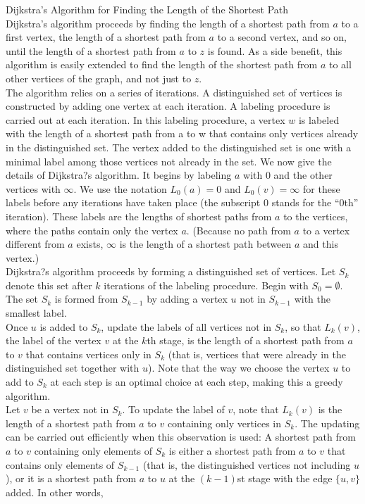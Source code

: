 \documentclass[12pt]{article}
\begin{document}
\begin{alg} Dijkstra's Algorithm for Finding the Length of the Shortest Path \\ 

Dijkstra's algorithm proceeds by finding the length of a shortest path from $a$ to a first vertex, the length of a shortest path from $a$ to a second vertex, and so on, until the length of a shortest path from $a$ to $z$ is found. As a side benefit, this algorithm is easily extended to find the length of the shortest path from $a$ to all other vertices of the graph, and not just to $z$.\\ The algorithm relies on a series of iterations. A distinguished set of vertices is constructed by adding one vertex at each iteration. A labeling procedure is carried out at each iteration. In this labeling procedure, a vertex $w$ is labeled with the length of a shortest path from a to w that contains only vertices already in the distinguished set. The vertex added to the distinguished set is one with a minimal label among those vertices not already in the set.
We now give the details of Dijkstra?s algorithm. It begins by labeling $a$ with 0 and the other vertices with $\infty$. We use the notation $L_0(a) = 0$ and $L_0(v) = \infty$ for these labels before any iterations have taken place (the subscript 0 stands for the ``0th'' iteration). These labels are the lengths of shortest paths from $a$ to the vertices, where the paths contain only the vertex $a$. (Because no path from $a$ to a vertex different from $a$ exists, $\infty$ is the length of a shortest path between $a$ and this vertex.) \\
Dijkstra?s algorithm proceeds by forming a distinguished set of vertices. Let $S_k$ denote this set after $k$ iterations of the labeling procedure. Begin with $S_0 = \emptyset$. The set $S_k$ is formed from $S_{k-1}$ by adding a vertex $u$ not in $S_{k-1}$ with the smallest label.\\
Once $u$ is added to $S_k$, update the labels of all vertices not in $S_k$, so that $L_k(v)$, the label of the vertex $v$ at the $k$th stage, is the length of a shortest path from $a$ to $v$ that contains vertices only in $S_k$ (that is, vertices that were already in the distinguished set together with $u$). Note that the way we choose the vertex $u$ to add to $S_k$ at each step is an optimal choice at each step, making this a greedy algorithm. \\
Let $v$ be a vertex not in $S_k$. To update the label of $v$, note that $L_k (v)$ is the length of a shortest path from $a$ to $v$ containing only vertices in $S_k$. The updating can be carried out efficiently when this observation is used: A shortest path from $a$ to $v$ containing only elements of $S_k$ is either a shortest path from $a$ to $v$ that contains only elements of $S_{k-1}$ (that is, the distinguished vertices not including $u$), or it is a shortest path from $a$ to $u$ at the $(k - 1)$st stage with the edge $\{u, v\}$ added. In other words,

\end{alg}
\end{document}
